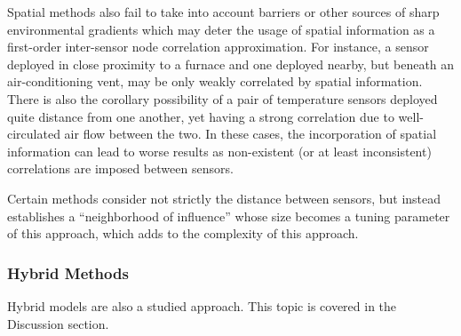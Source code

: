 Spatial methods also fail to take into account barriers or other sources of sharp environmental gradients which may deter the usage of spatial information as a first-order inter-sensor node correlation approximation.
For instance, a sensor deployed in close proximity to a furnace and one deployed nearby, but beneath an air-conditioning vent, may be only weakly correlated by spatial information.
There is also the corollary possibility of a pair of temperature sensors deployed quite distance from one another, yet having a strong correlation due to well-circulated air flow between the two.
In these cases, the incorporation of spatial information can lead to worse results as non-existent (or at least inconsistent) correlations are imposed between sensors.



Certain methods consider not strictly the distance between sensors, but instead establishes a ``neighborhood of influence'' whose size becomes a tuning parameter of this approach, which adds to the complexity of this approach.


\subsubsection{Hybrid Methods}
Hybrid models are also a studied approach.
This topic is covered in the Discussion section.



